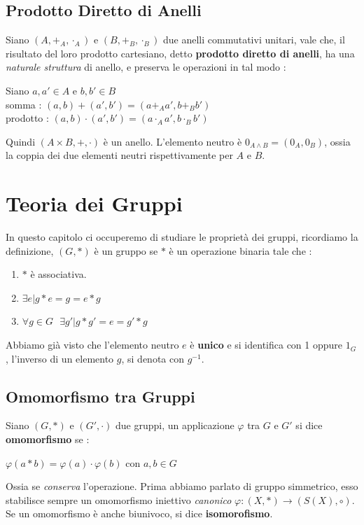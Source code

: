 \documentclass[12pt, letterpaper]{article}
\begin{document}
\subsection{Prodotto Diretto di Anelli}
Siano  \((A,+_A,\cdot_A)\) e \((B,+_B,\cdot_B)\) due anelli commutativi unitari, vale che, il risultato del loro
prodotto cartesiano, detto \textbf{prodotto diretto di anelli}, ha una \textit{naturale struttura} di anello, e preserva le operazioni in tal modo :\begin{center}
    Siano \(a,a'\in A\) e \(b,b'\in B\) \\
    somma : \((a,b)+(a',b')=(a+_A a',b+_B b')\)\\
    prodotto : \((a,b)\cdot(a',b')=(a\cdot_A a',b\cdot_B b')\)
\end{center}
Quindi \((A\times B,+,\cdot)\) è un anello.
L'elemento neutro è \(0_{A\land B}=(0_A,0_B)\), ossia la coppia dei due elementi neutri rispettivamente per \(A\) e \(B\).

\section{Teoria dei Gruppi}\label{teoGruppi}
In questo capitolo ci occuperemo di studiare le proprietà dei gruppi, ricordiamo la definizione,
\((G,*)\) è un gruppo se \(*\) è un operazione binaria tale che : \begin{enumerate}
    \item \(*\) è associativa.
    \item \(\exists e|g*e=g=e*g\)
    \item \(\forall g\in G \text{ } \exists g' | g*g'=e=g'*g\)
\end{enumerate}
Abbiamo già visto che l'elemento neutro \(e\) è \textbf{unico} e si identifica con 1 oppure \(1_G\), l'inverso di un 
elemento \(g\), si denota con \(g^{-1}\).
 \subsection{Omomorfismo tra Gruppi}
 Siano \((G,*)\) e \((G',\cdot)\) due gruppi, un applicazione \(\varphi\) tra \(G\) e \(G'\) si dice \textbf{omomorfismo}
  se :\begin{center}
    \(
        \varphi(a*b)=\varphi(a)\cdot \varphi(b) \text{ con }a,b\in G  
    \)
  \end{center}
Ossia se \textit{conserva} l'operazione. Prima abbiamo parlato di gruppo simmetrico, esso stabilisce sempre un 
omomorfismo iniettivo \textit{canonico} \(\varphi : (X,*)\rightarrow (S(X),\circ)\). Se un omomorfismo è anche 
biunivoco, si dice \textbf{isomorofismo}.
\end{document}
